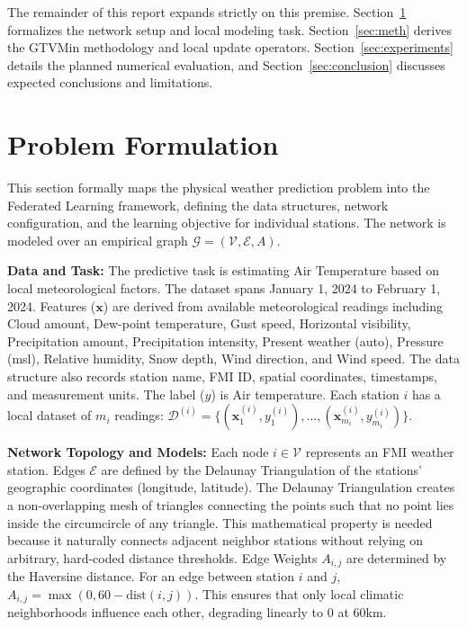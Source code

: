 \documentclass{article}
\begin{document}
The remainder of this report expands strictly on this premise. Section~\ref{sec:pf} formalizes the network setup and local modeling task. Section~\ref{sec:meth} derives the GTVMin methodology and local update operators. Section~\ref{sec:experiments} details the planned numerical evaluation, and Section~\ref{sec:conclusion} discusses expected conclusions and limitations.

\section{Problem Formulation}
\label{sec:pf}

This section formally maps the physical weather prediction problem into the Federated Learning framework, defining the data structures, network configuration, and the learning objective for individual stations. The network is modeled over an empirical graph $\mathcal{G} = (\mathcal{V}, \mathcal{E}, A)$.

\textbf{Data and Task:} The predictive task is estimating Air Temperature based on local meteorological factors. The dataset spans January 1, 2024 to February 1, 2024. Features ($\mathbf{x}$) are derived from available meteorological readings including Cloud amount, Dew-point temperature, Gust speed, Horizontal visibility, Precipitation amount, Precipitation intensity, Present weather (auto), Pressure (msl), Relative humidity, Snow depth, Wind direction, and Wind speed. The data structure also records station name, FMI ID, spatial coordinates, timestamps, and measurement units. The label ($y$) is Air temperature. Each station $i$ has a local dataset of $m_i$ readings: $\mathcal{D}^{(i)} = \{(\mathbf{x}^{(i)}_1, y^{(i)}_1), \dots, (\mathbf{x}^{(i)}_{m_i}, y^{(i)}_{m_i})\}$.

\textbf{Network Topology and Models:} Each node $i \in \mathcal{V}$ represents an FMI weather station. Edges $\mathcal{E}$ are defined by the Delaunay Triangulation of the stations' geographic coordinates (longitude, latitude). The Delaunay Triangulation creates a non-overlapping mesh of triangles connecting the points such that no point lies inside the circumcircle of any triangle. This mathematical property is needed because it naturally connects adjacent neighbor stations without relying on arbitrary, hard-coded distance thresholds. Edge Weights $A_{i,j}$ are determined by the Haversine distance. For an edge between station $i$ and $j$, $A_{i,j} = \max(0, 60 - \text{dist}(i,j))$. This ensures that only local climatic neighborhoods influence each other, degrading linearly to 0 at 60km. 
\end{document}
